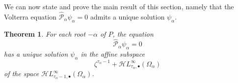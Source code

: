 \documentclass{article}
\theoremstyle{plain}
\newtheorem{thm}{Theorem}
\newcommand{\singexp}[2]{\mathcal{H}L^\infty_{#1, #2}}
\newcommand{\singexpalg}[1]{\singexp{#1}{\bullet}}
\newcommand{\domain}{\Omega}
\begin{document}
We can now state and prove the main result of this section, namely that the Volterra equation $\hat{\mathcal{P}}_\alpha \psi_\alpha = 0$ admits a unique solution $\psi_\alpha$. %

\begin{thm}\label{thm:example}
For each root $-\alpha$ of $P$, the equation
\[ \hat{\mathcal{P}}_\alpha \psi_\alpha = 0 \]
has a unique solution $\psi_\alpha$ in the affine subspace
\[ \zeta^{\tau_\alpha-1} + \singexpalg{\tau_\alpha}(\domain_\alpha) \]
of the space $\singexpalg{\tau_\alpha-1}(\domain_\alpha)$.
\end{thm}
\end{document}
